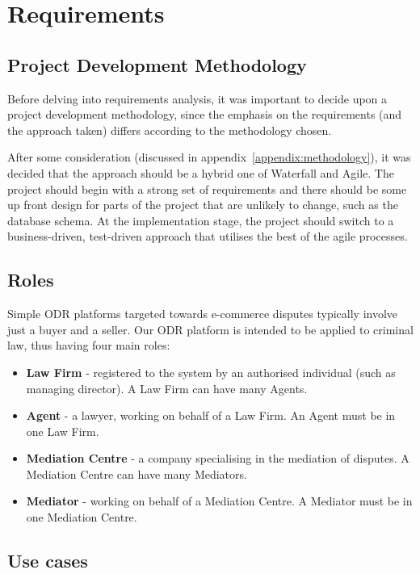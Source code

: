 \chapter{Requirements}

\section{Project Development Methodology}

Before delving into requirements analysis, it was important to decide upon a project development methodology, since the emphasis on the requirements (and the approach taken) differs according to the methodology chosen.

After some consideration (discussed in appendix~\ref{appendix:methodology}), it was decided that the approach should be a hybrid one of Waterfall and Agile. The project should begin with a strong set of requirements and there should be some up front design for parts of the project that are unlikely to change, such as the database schema. At the implementation stage, the project should switch to a business-driven, test-driven approach that utilises the best of the agile processes.

\section{Roles}

Simple ODR platforms targeted towards e-commerce disputes typically involve just a buyer and a seller. Our ODR platform is intended to be applied to criminal law, thus having four main roles:

\begin{itemize}
\item \textbf{Law Firm} - registered to the system by an authorised individual (such as managing director). A Law Firm can have many Agents.
\item \textbf{Agent} - a lawyer, working on behalf of a Law Firm. An Agent must be in one Law Firm.
\item \textbf{Mediation Centre} - a company specialising in the mediation of disputes. A Mediation Centre can have many Mediators.
\item \textbf{Mediator} - working on behalf of a Mediation Centre. A Mediator must be in one Mediation Centre.
\end{itemize}

\section{Use cases}


